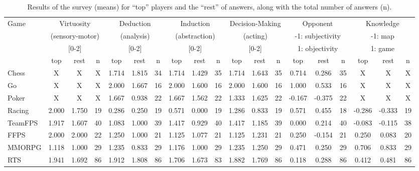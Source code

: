 \begin{table}

\begin{tabular}{|l|ccc|ccc|ccc|ccc|ccc|ccc|}
\hline
Game & \multicolumn{3}{|c|}{Virtuosity} & \multicolumn{3}{|c|}{Deduction} & \multicolumn{3}{|c|}{Induction} & \multicolumn{3}{|c|}{Decision-Making} & \multicolumn{3}{|c|}{Opponent} & \multicolumn{3}{|c|}{Knowledge}\\
 & \multicolumn{3}{|c|}{(sensory-motor)} & \multicolumn{3}{|c|}{(analysis)} & \multicolumn{3}{|c|}{(abstraction)} & \multicolumn{3}{|c|}{(acting)} & \multicolumn{3}{|c|}{-1: subjectivity} & \multicolumn{3}{|c|}{-1: map} \\
 & \multicolumn{3}{|c|}{[0-2]} & \multicolumn{3}{|c|}{[0-2]} & \multicolumn{3}{|c|}{[0-2]} & \multicolumn{3}{|c|}{[0-2]} & \multicolumn{3}{|c|}{1: objectivity} & \multicolumn{3}{|c|}{1: game} \\
 & top & rest & n & top & rest & n & top & rest & n & top & rest & n & top & rest & n & top & rest & n \\
\hline
Chess &  X & X & X  & 1.714 & 1.815 & 34 & 1.714 & 1.429 & 35 & 1.714 & 1.643 & 35 & 0.714 & 0.286 & 35 &  X & X & X  \\
Go &  X & X & X  & 2.000 & 1.667 & 16 & 2.000 & 1.600 & 16 & 2.000 & 1.600 & 16 & 1.000 & 0.533 & 16 &  X & X & X  \\
Poker &  X & X & X  & 1.667 & 0.938 & 22 & 1.667 & 1.562 & 22 & 1.333 & 1.625 & 22 & -0.167 & -0.375 & 22 &  X & X & X  \\
Racing & 2.000 & 1.750 & 19 & 0.286 & 0.250 & 19 & 0.571 & 0.000 & 19 & 1.286 & 0.833 & 19 & 0.571 & 0.455 & 18 & -0.286 & -0.333 & 19 \\
TeamFPS & 1.917 & 1.607 & 40 & 1.083 & 1.000 & 39 & 1.417 & 0.929 & 40 & 1.417 & 1.185 & 39 & 0.000 & 0.214 & 40 & -0.083 & -0.115 & 38 \\
FFPS & 2.000 & 2.000 & 22 & 1.250 & 1.000 & 21 & 1.125 & 1.077 & 21 & 1.125 & 1.231 & 21 & 0.250 & -0.154 & 21 & 0.250 & 0.083 & 20 \\
MMORPG & 1.118 & 1.000 & 29 & 1.235 & 0.833 & 29 & 1.176 & 1.000 & 29 & 1.235 & 1.250 & 29 & 0.471 & 0.250 & 29 & 0.706 & 0.833 & 29 \\
RTS & 1.941 & 1.692 & 86 & 1.912 & 1.808 & 86 & 1.706 & 1.673 & 83 & 1.882 & 1.769 & 86 & 0.118 & 0.288 & 86 & 0.412 & 0.481 & 86 \\
\hline
\end{tabular}
\label{fullsurveygamers}
\caption{Results of the survey (means) for ``top'' players and the ``rest'' of answers, along with the total number of answers (n).}
\end{table}


